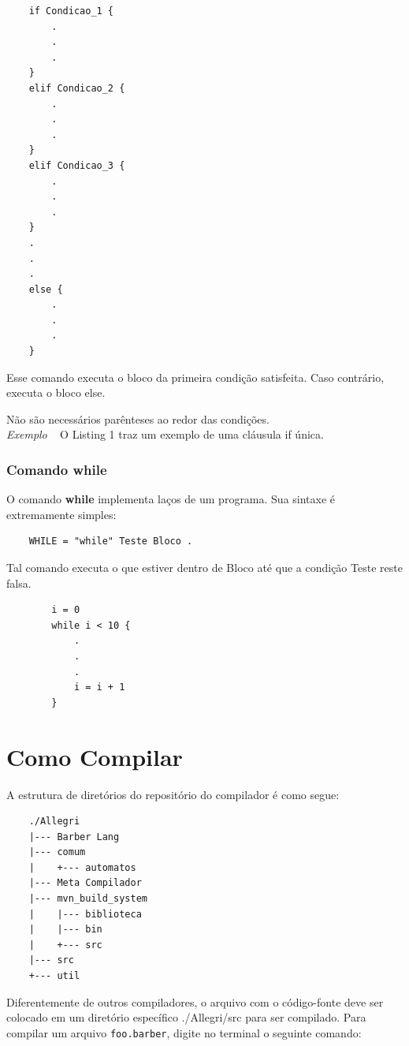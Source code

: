 \documentclass[a4paper,12pt]{report}
\begin{document}
    \begin{lstlisting}
    if Condicao_1 {
        .
        .
        .
    }
    elif Condicao_2 {
        .
        .
        .
    }
    elif Condicao_3 {
        .
        .
        .
    }
    .
    .
    .
    else {
        .
        .
        .
    }
    \end{lstlisting}

    Esse comando executa o bloco da primeira condição satisfeita. Caso contrário, executa o bloco else.

    Não são necessários parênteses ao redor das condições.\\

    \textit{Exemplo} ~ O Listing 1 traz um exemplo de uma cláusula if única.


    \subsubsection*{Comando while}
    O comando \textbf{while} implementa laços de um programa. Sua sintaxe é extremamente simples:
    \begin{verbatim}
    WHILE = "while" Teste Bloco . \end{verbatim}
    Tal comando executa o que estiver dentro de Bloco até que a condição Teste reste falsa.
    \begin{lstlisting}
        i = 0
        while i < 10 {
            .
            .
            .
            i = i + 1
        }
    \end{lstlisting}

    \section*{Como Compilar}
    A estrutura de diretórios do repositório do compilador é como segue:
    \begin{verbatim}
    ./Allegri
    |--- Barber Lang
    |--- comum
    |    +--- automatos
    |--- Meta Compilador
    |--- mvn_build_system
    |    |--- biblioteca
    |    |--- bin
    |    +--- src
    |--- src
    +--- util
    \end{verbatim}

    Diferentemente de outros compiladores, o arquivo com o código-fonte deve ser colocado em um diretório específico \textemdash \space ./Allegri/src \textemdash \space para ser compilado. Para compilar um arquivo \verb|foo.barber|, digite no terminal o seguinte comando:
\end{document}
